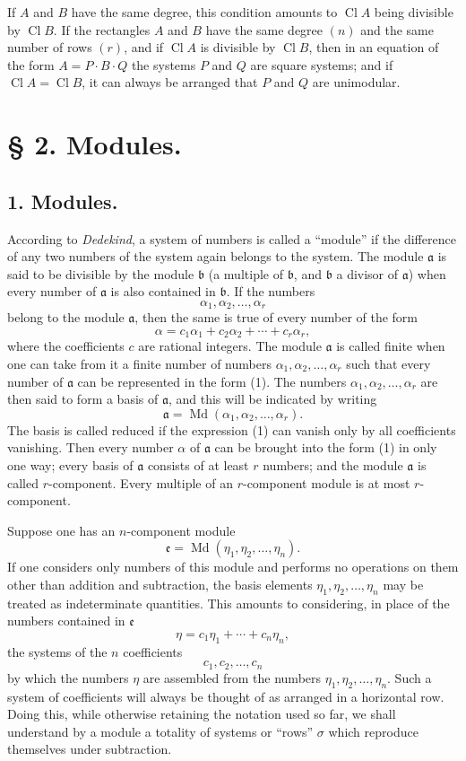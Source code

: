 \documentclass[11pt,a4paper]{article}
\newcommand{\Cl}{\operatorname{Cl}}
\newcommand{\Md}{\operatorname{Md}}
\begin{document}
If $A$ and $B$ have the same degree, this condition amounts to $\Cl A$ being divisible by $\Cl B$. If the rectangles $A$ and $B$ have the same degree $(n)$ and the same number of rows $(r)$, and if $\Cl A$ is divisible by $\Cl B$, then in an equation of the form $A=P\cdot B\cdot Q$ the systems $P$ and $Q$ are square systems; and if $\Cl A=\Cl B$, it can always be arranged that $P$ and $Q$ are unimodular.

\section*{§ 2. Modules.}

\subsection*{1. Modules.}

According to \emph{Dedekind}, a system of numbers is called a ``module'' if the difference of any two numbers of the system again belongs to the system. The module $\mathfrak a$ is said to be divisible by the module $\mathfrak b$ (a multiple of $\mathfrak b$, and $\mathfrak b$ a divisor of $\mathfrak a$) when every number of $\mathfrak a$ is also contained in $\mathfrak b$. If the numbers
\[
 \alpha_1,\alpha_2,\ldots,\alpha_r
\]
belong to the module $\mathfrak a$, then the same is true of every number of the form
\begin{equation}
 \alpha=c_1\alpha_1+c_2\alpha_2+\cdots+c_r\alpha_r,
\tag{1}
\end{equation}
where the coefficients $c$ are rational integers. The module $\mathfrak a$ is called finite when one can take from it a finite number of numbers $\alpha_1,\alpha_2,\ldots,\alpha_r$ such that every number of $\mathfrak a$ can be represented in the form (1). The numbers $\alpha_1,\alpha_2,\ldots,\alpha_r$ are then said to form a basis of $\mathfrak a$, and this will be indicated by writing
\[
 \mathfrak a=\Md(\alpha_1,\alpha_2,\ldots,\alpha_r).
\]
The basis is called reduced if the expression (1) can vanish only by all coefficients vanishing. Then every number $\alpha$ of $\mathfrak a$ can be brought into the form (1) in only one way; every basis of $\mathfrak a$ consists of at least $r$ numbers; and the module $\mathfrak a$ is called $r$-component. Every multiple of an $r$-component module is at most $r$-component.

Suppose one has an $n$-component module
\[
 \mathfrak e=\Md(\eta_1,\eta_2,\ldots,\eta_n).
\]
If one considers only numbers of this module and performs no operations on them other than addition and subtraction, the basis elements $\eta_1,\eta_2,\ldots,\eta_n$ may be treated as indeterminate quantities. This amounts to considering, in place of the numbers contained in $\mathfrak e$
\[
 \eta=c_1\eta_1+\cdots+c_n\eta_n,
\]
the systems of the $n$ coefficients
\[
 c_1,c_2,\ldots,c_n
\]
by which the numbers $\eta$ are assembled from the numbers $\eta_1,\eta_2,\ldots,\eta_n$. Such a system of coefficients will always be thought of as arranged in a horizontal row. Doing this, while otherwise retaining the notation used so far, we shall understand by a module a totality of systems or ``rows'' $\sigma$ which reproduce themselves under subtraction.
\end{document}
